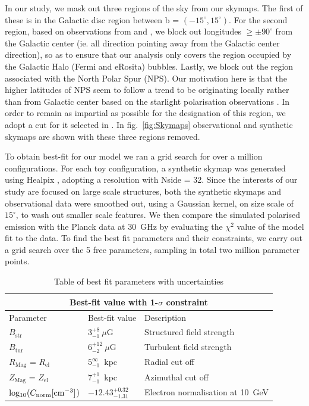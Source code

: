\documentclass[usenatbib]{mnras}
\begin{document}
In our study, we mask out three regions of the sky from our skymaps. The first of these is in the Galactic disc region between b = $(-15^{\circ},15^{\circ})$. For the second region, based on observations from \cite{eROSITA} and \cite{Su_2010}, we block out longitudes  $\geq \pm 90^{\circ}$ from the Galactic center (ie. all direction pointing away from the Galactic center direction), so as to ensure that our analysis only covers the region occupied by the Galactic Halo (Fermi and eRosita) bubbles. Lastly, we block out the region associated with the North Polar Spur (NPS). Our motivation here is that the higher latitudes of NPS seem to follow a trend to be originating locally rather than from Galactic center based on the starlight polarisation observations \cite{Gina_2021}. In order to remain as impartial as possible for the designation of this region, we adopt a cut for it selected in \cite{Wolleben_2007}. In fig.~\ref{fig:Skymaps} observational and synthetic skymaps are shown with these three regions removed.


To obtain best-fit for our model we ran a grid search for over a million configurations. For each toy configuration, a synthetic skymap was generated using Healpix \cite{Healpix_2005}, adopting a resolution with Nside = 32. Since the interests of our study are focused on large scale structures, both the synthetic skymaps and observational data were smoothed out, using a Gaussian kernel, on size scale of $15^{\circ}$, to wash out smaller scale features. We then compare the simulated polarised emission with the Planck data at 30~GHz by evaluating the $\chi^{2}$ value of the model fit to the data. To find the best fit parameters and their constraints, we carry out a grid search over the 5 free parameters, sampling in total two million parameter points.

\begin{table}
\centering
\caption{Table of best fit parameters with uncertainties}
\begin{tabular}{ |p{}|p{4.5cm}|p{6.5cm}|  }
\hline
\multicolumn{3}{|c|}{Best-fit value with 1-$\sigma$ constraint} \\
\hline
Parameter & Best-fit value &Description \\
\hline
\hline
$B_{\mathrm{str}} $& $3_{-1}^{+8} ~ \mu$G & Structured field strength \\
\hline
$B_{\mathrm{tur}} $& $ 6_{-2}^{+12} ~\mu$G & Turbulent field strength\\
\hline
$R_{\mathrm{Mag}}$ = $R_{\mathrm{el}}$ & $5_{-1}^{\infty}$~kpc & Radial cut off \\
\hline
$Z_{\mathrm{Mag}}$ = $Z_{\mathrm{el}}$ & $7_{-1}^{+1}$~kpc & Azimuthal cut off\\
\hline
\rule{0pt}{3ex} 
${\rm{log_{10}}}(C_{\rm norm} [{\rm cm}^{-3}]$) & ${-12.43}_{{-1.31}}^{{+0.32}}$ & Electron normalisation at 10~GeV\\
\hline
\end{tabular}
\label{Para_table}
\end{table}
\end{document}
